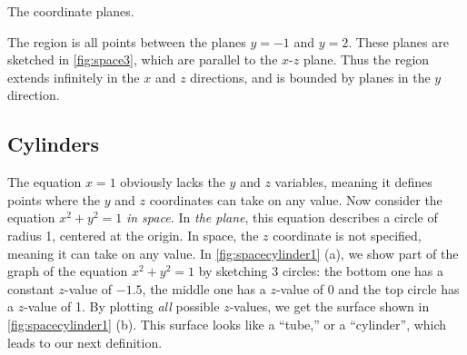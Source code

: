 \begin{lxfigure}
\caption{The coordinate planes.}\label{fig:coordplanes}
\end{lxfigure}



{The region is all points between the planes $y=-1$ and $y=2$. These planes are sketched in \autoref{fig:space3}, which are parallel to the $x$-$z$ plane. Thus the region extends infinitely in the $x$ and $z$ directions, and is bounded by planes in the $y$ direction.}


\subsection*{Cylinders}

The equation $x=1$ obviously lacks the $y$ and $z$ variables, meaning it defines points where the $y$ and $z$ coordinates can take on any value. Now consider the equation $x^2+y^2=1$ \emph{in space.} In \emph{the plane}, this equation describes a circle of radius 1, centered at the origin. In space, the $z$ coordinate is not specified, meaning it can take on any value. In \autoref{fig:spacecylinder1} (a), we show part of the graph of the equation $x^2+y^2=1$ by sketching 3 circles: the bottom one has a constant $z$-value of $-1.5$, the middle one has a $z$-value of 0 and the top circle has a $z$-value of 1. By plotting \emph{all} possible $z$-values, we get the  surface shown in \autoref{fig:spacecylinder1} (b). This surface looks like a ``tube,'' or a ``cylinder'', which leads to our next definition.

